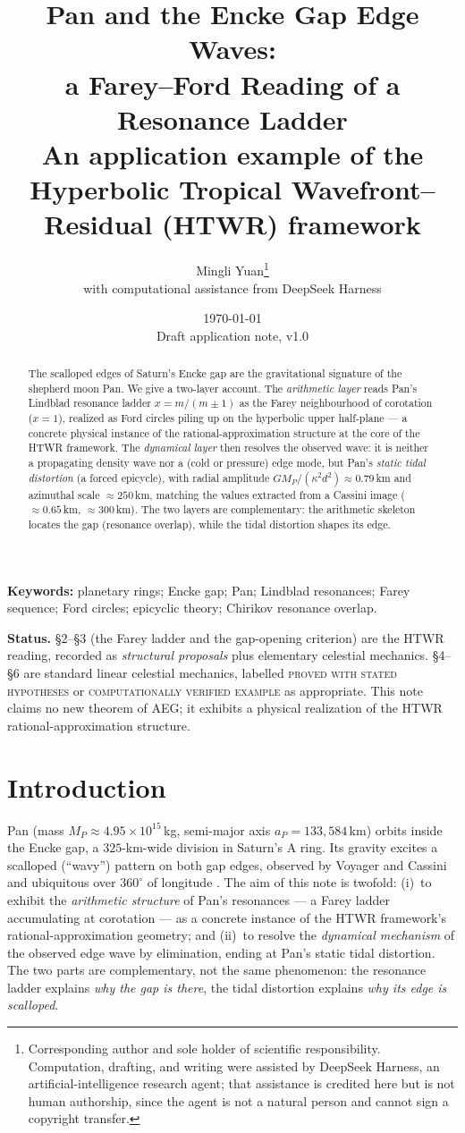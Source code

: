\documentclass[11pt]{article}
\title{\textbf{Pan and the Encke Gap Edge Waves:\\[0.3em]
a Farey--Ford Reading of a Resonance Ladder}\\[0.35em]
\large An application example of the Hyperbolic Tropical
Wavefront--Residual (HTWR) framework}
\author{
Mingli Yuan\thanks{Corresponding author and sole holder of scientific
responsibility.  Computation, drafting, and writing were assisted by DeepSeek
Harness, an artificial-intelligence research agent; that assistance is credited
here but is not human authorship, since the agent is not a natural person and
cannot sign a copyright transfer.}\\
\small with computational assistance from DeepSeek Harness
}
\date{\today\\[0.25em]\small Draft application note, v1.0}
\theoremstyle{remark}
\begin{document}
\maketitle

\begin{abstract}
The scalloped edges of Saturn's Encke gap are the gravitational signature of the
shepherd moon Pan.  We give a two-layer account.  The \emph{arithmetic layer}
reads Pan's Lindblad resonance ladder $x=m/(m\pm1)$ as the Farey neighbourhood of
corotation ($x=1$), realized as Ford circles piling up on the hyperbolic upper
half-plane --- a concrete physical instance of the rational-approximation
structure at the core of the HTWR framework.  The \emph{dynamical layer} then
resolves the observed wave: it is neither a propagating density wave nor a (cold
or pressure) edge mode, but Pan's \emph{static tidal distortion} (a forced
epicycle), with radial amplitude $GM_P/(\kappa^2 d^2)\approx0.79$\,km and
azimuthal scale $\approx250$\,km, matching the values extracted from a Cassini
image ($\approx0.65$\,km, $\approx300$\,km).  The two layers are complementary:
the arithmetic skeleton locates the gap (resonance overlap), while the tidal
distortion shapes its edge.
\end{abstract}

\noindent\textbf{Keywords:} planetary rings; Encke gap; Pan; Lindblad resonances;
Farey sequence; Ford circles; epicyclic theory; Chirikov resonance overlap.

\noindent\textbf{Status.} \S2--\S3 (the Farey ladder and the gap-opening
criterion) are the HTWR reading, recorded as \emph{structural proposals} plus
elementary celestial mechanics.  \S4--\S6 are standard linear celestial
mechanics, labelled \textsc{proved with stated hypotheses} or
\textsc{computationally verified example} as appropriate.  This note claims no
new theorem of AEG; it exhibits a physical realization of the HTWR
rational-approximation structure.

\section{Introduction}\label{sec:intro}

Pan (mass $M_P\approx4.95\times10^{15}$\,kg, semi-major axis
$a_P=133{,}584$\,km) orbits inside the Encke gap, a $325$-km-wide division in
Saturn's A ring.  Its gravity excites a scalloped (``wavy'') pattern on both gap
edges, observed by Voyager and Cassini and ubiquitous over $360^\circ$ of
longitude \cite{Tiscareno2005WavyEdges}.  The aim of this note is twofold:
(i)~to exhibit the \emph{arithmetic structure} of Pan's resonances --- a Farey
ladder accumulating at corotation --- as a concrete instance of the HTWR
framework's rational-approximation geometry; and (ii)~to resolve the
\emph{dynamical mechanism} of the observed edge wave by elimination, ending at
Pan's static tidal distortion.  The two parts are complementary, not the same
phenomenon: the resonance ladder explains \emph{why the gap is there}, the tidal
distortion explains \emph{why its edge is scalloped}.
\end{document}
